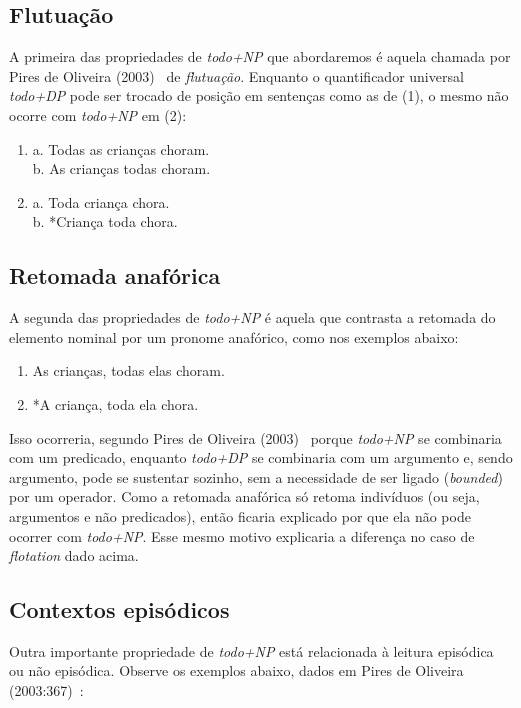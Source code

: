 \subsection{Flutuação}
A primeira das propriedades de \emph{todo+NP} que abordaremos é aquela chamada por Pires de Oliveira (2003)~\cite{PiresOliv2003} de \emph{flutuação}. Enquanto o quantificador universal \emph{todo+DP} pode ser trocado de posição em sentenças como as de (1), o mesmo não ocorre com \emph{todo+NP} em (2):

\begin{enumerate}
    \item a. Todas as crianças choram. \\
    b. As crianças todas choram.
    \item a. Toda criança chora. \\
    b. *Criança toda chora.
\end{enumerate}

\subsection{Retomada anafórica}
A segunda das propriedades de \emph{todo+NP} é aquela que contrasta a retomada do elemento nominal por um pronome anafórico, como nos exemplos abaixo:

\begin{enumerate}[resume]
    \item As crianças, todas elas choram.
    \item *A criança, toda ela chora.
\end{enumerate}

Isso ocorreria, segundo Pires de Oliveira (2003)~\cite{PiresOliv2003} porque \emph{todo+NP} se combinaria com um predicado, enquanto \emph{todo+DP} se combinaria com um argumento e, sendo argumento, pode se sustentar sozinho, sem a necessidade de ser ligado (\emph{bounded}) por um operador. Como a retomada anafórica só retoma indivíduos (ou seja, argumentos e não predicados), então ficaria explicado por que ela não pode ocorrer com \emph{todo+NP}. Esse mesmo motivo explicaria a diferença no caso de \emph{flotation} dado acima.

\subsection{Contextos episódicos}
Outra importante propriedade de \emph{todo+NP} está relacionada à leitura episódica ou não episódica. Observe os exemplos abaixo, dados em Pires de Oliveira (2003:367)~\cite{PiresOliv2003}:

